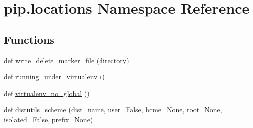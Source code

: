 \hypertarget{namespacepip_1_1locations}{}\section{pip.\+locations Namespace Reference}
\label{namespacepip_1_1locations}
\subsection*{Functions}
\begin{DoxyCompactItemize}
\item 
def \hyperlink{namespacepip_1_1locations_a45248619f9e84d94d3ca01000d4b31a8}{write\+\_\+delete\+\_\+marker\+\_\+file} (directory)
\item 
def \hyperlink{namespacepip_1_1locations_a042f3a1b12ebc3488f8e609ae25a2825}{running\+\_\+under\+\_\+virtualenv} ()
\item 
def \hyperlink{namespacepip_1_1locations_ab4f8c03a4b4174e2eb2bc59ed836c2ee}{virtualenv\+\_\+no\+\_\+global} ()
\item 
def \hyperlink{namespacepip_1_1locations_a749771d21bde6287da42c380135c5b06}{distutils\+\_\+scheme} (dist\+\_\+name, user=False, home=None, root=None, isolated=False, prefix=None)
\end{DoxyCompactItemize}
